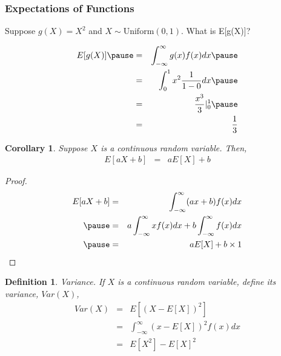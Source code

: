 \documentclass[handout]{beamer}
\newtheorem{defn}{Definition}
\newtheorem{cor}{Corollary}
\numberwithin{equation}{section}
\begin{document}
\begin{frame}
\frametitle{Expectations of Functions} 

Suppose $g(X) = X^2$  and $X \sim \text{Uniform}(0,1)$.  What is E[g(X)]? \pause 

\begin{eqnarray}
E[g(X)] \pause  & = & \int_{-\infty}^{\infty} g(x)f(x)dx \nonumber \pause  \\
& = & \int_{0}^{1} x^2 \frac{1}{1-0}dx \nonumber  \pause \\
& = & \frac{x^3}{3}|^{1}_{0} \nonumber  \pause \\
& = & \frac{1}{3} \nonumber 
\end{eqnarray}


\end{frame}


\begin{frame}

\begin{cor} 
Suppose $X$ is a continuous random variable.  Then, 
\begin{eqnarray}
E[aX + b] & = & aE[X] + b\nonumber 
\end{eqnarray}
\end{cor}
\pause 

\begin{proof}
\begin{eqnarray}
E[aX + b] & = & \int_{-\infty}^{\infty} (a x + b)f(x) dx \nonumber \\ \pause 
& = & a \int_{-\infty}^{\infty} x f(x) dx + b \int_{-\infty}^{\infty} f(x)dx \nonumber \\ \pause 
& = & a E[X]  + b \times 1 \nonumber 
\end{eqnarray}


\end{proof}


\end{frame}




\begin{frame}


\begin{defn} 
Variance.  If $X$ is a continuous random variable, define its variance, $Var(X)$, 
\begin{eqnarray}
Var(X) & = & E[(X- E[X])^2] \nonumber \\
& = & \int_{-\infty}^{\infty} (x - E[X])^2f(x) dx \nonumber \\
& = & E[X^2] - E[X]^2 \nonumber 
\end{eqnarray}
\end{defn}

\end{frame}
\end{document}
